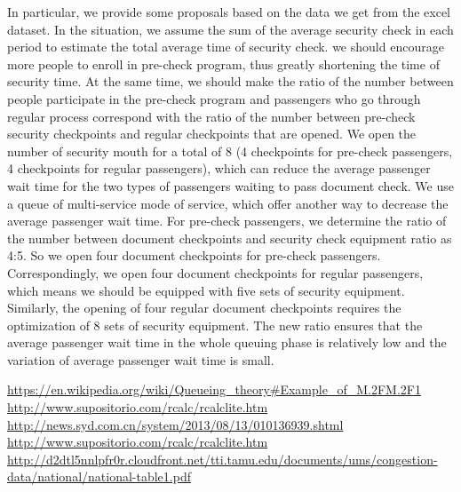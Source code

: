 \documentclass{mcmthesis}
\begin{document}
\par In particular, we provide some proposals based on the data we get from the excel dataset. In the situation, we assume the sum of the average security check in each period to estimate the total average time of security check. we should encourage more people to enroll in pre-check program, thus greatly shortening the time of security time. At the same time, we should make the ratio of the number between people participate in the pre-check program and passengers who go through regular process correspond with the ratio of the number between pre-check security checkpoints and regular checkpoints that are opened. We open the number of security mouth for a total of 8 (4 checkpoints for pre-check passengers, 4 checkpoints for regular passengers), which can reduce the average passenger wait time for the two types of passengers waiting to pass document check. We use a queue of multi-service mode of service, which offer another way to decrease the average passenger wait time. For pre-check passengers, we determine the ratio of the number between document checkpoints and security check equipment ratio as 4:5. So we open four document checkpoints for pre-check passengers. Correspondingly, we open four document checkpoints for regular passengers, which means we should be equipped with five sets of security equipment. Similarly, the opening of four regular document checkpoints requires the optimization of 8 sets of security equipment. The new ratio ensures that the average passenger wait time in the whole queuing phase is relatively low and the variation of average passenger wait time is small.





































\begin{thebibliography}{99}

 \url{https://en.wikipedia.org/wiki/Queueing_theory#Example_of_M.2FM.2F1}
 \url{http://www.supositorio.com/rcalc/rcalclite.htm}
 \url{http://news.syd.com.cn/system/2013/08/13/010136939.shtml}
 \url{http://www.supositorio.com/rcalc/rcalclite.htm}
 \url{http://d2dtl5nnlpfr0r.cloudfront.net/tti.tamu.edu/documents/ums/congestion-data/national/national-table1.pdf}
\end{thebibliography}
\end{document}
